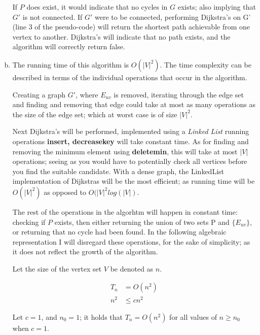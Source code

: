 \documentclass[10pt]{article}
\begin{document}
\begin{question}
\begin{enumerate}[a)]
            If $P$ does  exist, it would indicate that no cycles in $G$ exists; also implying that $G'$ is not connected. If $G'$ were to be connected, performing Dijkstra's on G' (line 3 of the pseudo-code) will return the shortest path achievable from one vertex to another. Dijkstra's will indicate that no path exists, and the algorithm will correctly return false.
        \item
            The running time of this algorithm is $O(|V|^2)$. The time complexity can be described in terms of the individual operations that occur in the algorithm.
            
            Creating a graph $G'$, where $E_{uv}$ is removed, iterating through the edge set and finding and removing that edge could take at most as many operations as the size of the edge set; which at worst case is of size $|V|^2$.
            
            Next Dijkstra's will be performed, implemented using a \textit{ Linked List} running operations \textbf{insert, decreasekey} will take constant time. As for finding and removing the minimum element using \textbf{deletemin}, this will take at most $|V|$ operations; seeing as you would have to potentially check all vertices before you find the suitable candidate. With a dense graph, the LinkedList implementation of Dijkstras will be the most efficient; as running time will be $O(|V|^2)$ as opposed to $O(|V|^2log(|V|)$.
            
            The rest of the operations in the algorhtm will happen in constant time: checking if $P$ exists, then either returning the union of two sets P and $\{E_{uv}\}$, or returning that no cycle had been found. In the following algebraic representation I will disregard these operations, for the sake of simplicity; as it does not reflect the growth of the algorithm.
            
            Let the size of the vertex set $V$ be denoted as $n$.
            
            \begin{align*}
                T_n &= O(n^2) \\
                n^2 &\leq cn^2
            \end{align*}
            
            Let $c=1$, and $n_0 = 1$; it holds that $T_n = O(n^2)$ for all values of $n \geq n_0$ when $c=1$.
            
        
    \end{enumerate}  
\end{question}
\end{document}
